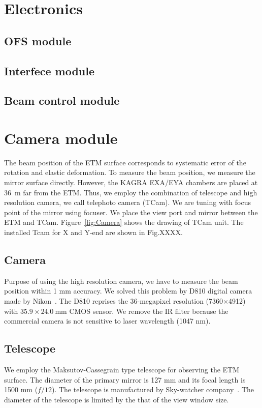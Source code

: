 \section{Electronics}
\subsection{OFS module}
\subsection{Interfece module}
\subsection{Beam control module}


\section{Camera module} \label{Tcam_inst}
The beam position of the ETM surface corresponds to systematic error of the rotation and elastic deformation. To measure the beam position, we measure the mirror surface directly. However, the KAGRA EXA/EYA chambers are placed at 36~m far from the ETM. Thus, we employ the combination of telescope and high resolution camera, we call telephoto camera (TCam). We are tuning with focus point of the mirror using focuser.  We place the view port and mirror between the ETM and TCam. Figure~\ref{fig:Camera} shows the drawing of TCam unit. The installed Tcam for X and Y-end are shown in Fig.XXXX.

\subsection{Camera}
Purpose of using the high resolution camera, we have to measure the beam position within 1 mm accuracy. We solved this problem by D810 digital camera made by Nikon~\cite{Nikon}. The D810 reprises the 36-megapixel resolution (7360$\times$4912) with $35.9 \times 24.0~\mathrm{mm}$ CMOS sensor. We remove the IR filter because the commercial camera is not sensitive to laser wavelength (1047 nm).

\subsection{Telescope}
We employ the Maksutov-Cassegrain type telescope for observing the ETM surface. The diameter of the primary mirror is 127 mm and its focal length is 1500 mm ($f/12$). The telescope is manufactured by Sky-watcher company~\cite{Skywatcher}. The diameter of the telescope is limited by the that of the view window size. 

